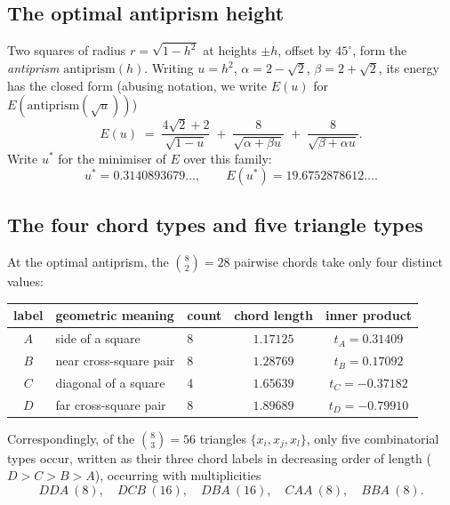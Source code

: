 \documentclass[11pt]{article}
\theoremstyle{definition}
\theoremstyle{remark}
\newcommand{\energy}{E}
\begin{document}
\subsection{The optimal antiprism height}
\label{sec:method-height}

Two squares of radius $r = \sqrt{1-h^2}$ at heights $\pm h$, offset by
$45^\circ$, form the \emph{antiprism} $\mathrm{antiprism}(h)$. Writing
$u = h^2$, $\alpha = 2-\sqrt2$, $\beta = 2+\sqrt2$, its energy has the closed
form (abusing notation, we write $\energy(u)$ for
$\energy(\mathrm{antiprism}(\sqrt u))$)
\begin{equation}
  \energy(u) \;=\; \frac{4\sqrt2+2}{\sqrt{1-u}} \;+\; \frac{8}{\sqrt{\alpha+\beta u}} \;+\; \frac{8}{\sqrt{\beta+\alpha u}}.
\end{equation}
Write $u^*$ for the minimiser of $\energy$ over this family:
\begin{equation}
  u^* = 0.3140893679\ldots, \qquad \energy(u^*) = 19.6752878612\ldots.
\end{equation}


\subsection{The four chord types and five triangle types}
\label{sec:method-chords}

At the optimal antiprism, the $\binom{8}{2}=28$ pairwise chords take only
four distinct values:

\begin{center}
\begin{tabular}{cll cc}
  \toprule
  label & geometric meaning & count & chord length & inner product \\
  \midrule
  $A$ & side of a square                        & 8 & $1.17125$ & $t_A = 0.31409$ \\
  $B$ & near cross-square pair                  & 8 & $1.28769$ & $t_B = 0.17092$ \\
  $C$ & diagonal of a square                     & 4 & $1.65639$ & $t_C = -0.37182$ \\
  $D$ & far cross-square pair                    & 8 & $1.89689$ & $t_D = -0.79910$ \\
  \bottomrule
\end{tabular}
\end{center}

Correspondingly, of the $\binom{8}{3}=56$ triangles $\{x_i,x_j,x_l\}$, only
five combinatorial types occur, written as their three chord labels in
decreasing order of length ($D>C>B>A$), occurring with multiplicities
\begin{equation}
  DDA\ (8), \quad DCB\ (16), \quad DBA\ (16), \quad CAA\ (8), \quad BBA\ (8).
\end{equation}
\end{document}
